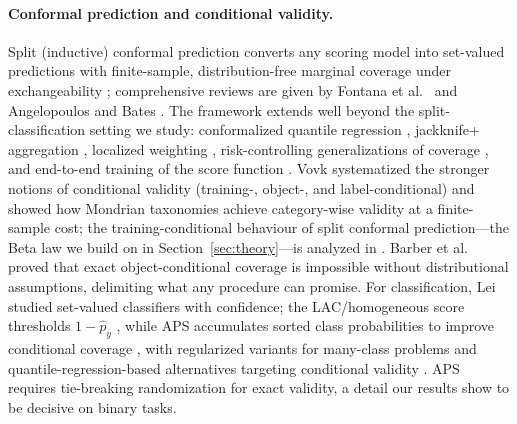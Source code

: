 \documentclass[review,12pt]{elsarticle}
\begin{document}
\paragraph{Conformal prediction and conditional validity.}
Split (inductive) conformal prediction converts any scoring model into set-valued predictions with finite-sample, distribution-free marginal coverage under exchangeability \cite{vovk2005,papadopoulos2002,shafer2008,lei2018,angelopoulos2023}; comprehensive reviews are given by Fontana et al.\ \cite{fontana2023} and Angelopoulos and Bates \cite{angelopoulos2023}. The framework extends well beyond the split-classification setting we study: conformalized quantile regression \cite{romano2019cqr}, jackknife+ aggregation \cite{barber2021jackknife}, localized weighting \cite{guan2023}, risk-controlling generalizations of coverage \cite{bates2021}, and end-to-end training of the score function \cite{stutz2022}. Vovk \cite{vovk2012} systematized the stronger notions of conditional validity (training-, object-, and label-conditional) and showed how Mondrian taxonomies achieve category-wise validity at a finite-sample cost; the training-conditional behaviour of split conformal prediction---the Beta law we build on in Section~\ref{sec:theory}---is analyzed in \cite{vovk2012,bian2023}. Barber et al.\ \cite{barber2021limits} proved that exact object-conditional coverage is impossible without distributional assumptions, delimiting what any procedure can promise. For classification, Lei \cite{lei2014} studied set-valued classifiers with confidence; the LAC/homogeneous score thresholds $1-\hat p_y$ \cite{sadinle2019}, while APS accumulates sorted class probabilities to improve conditional coverage \cite{romano2020aps}, with regularized variants for many-class problems \cite{angelopoulos2021} and quantile-regression-based alternatives targeting conditional validity \cite{cauchois2021}. APS requires tie-breaking randomization for exact validity, a detail our results show to be decisive on binary tasks.
\end{document}

